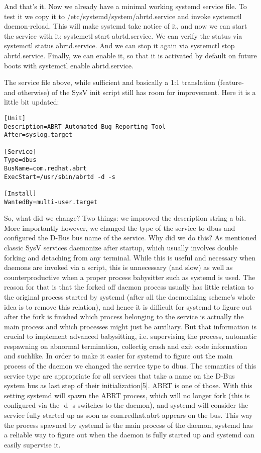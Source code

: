 \documentclass[titlepage]{article}
\begin{document}
And that's it. Now we already have a minimal working systemd service file. To test it we copy it to /etc/systemd/system/abrtd.service and invoke systemctl daemon-reload. This will make systemd take notice of it, and now we can start the service with it: systemctl start abrtd.service. We can verify the status via systemctl status abrtd.service. And we can stop it again via systemctl stop abrtd.service. Finally, we can enable it, so that it is activated by default on future boots with systemctl enable abrtd.service.

The service file above, while sufficient and basically a 1:1 translation (feature- and otherwise) of the SysV init script still has room for improvement. Here it is a little bit updated:
\begin{lstlisting}
[Unit]
Description=ABRT Automated Bug Reporting Tool
After=syslog.target

[Service]
Type=dbus
BusName=com.redhat.abrt
ExecStart=/usr/sbin/abrtd -d -s

[Install]
WantedBy=multi-user.target
\end{lstlisting}
So, what did we change? Two things: we improved the description string a bit. More importantly however, we changed the type of the service to dbus and configured the D-Bus bus name of the service. Why did we do this? As mentioned classic SysV services daemonize after startup, which usually involves double forking and detaching from any terminal. While this is useful and necessary when daemons are invoked via a script, this is unnecessary (and slow) as well as counterproductive when a proper process babysitter such as systemd is used. The reason for that is that the forked off daemon process usually has little relation to the original process started by systemd (after all the daemonizing scheme's whole idea is to remove this relation), and hence it is difficult for systemd to figure out after the fork is finished which process belonging to the service is actually the main process and which processes might just be auxiliary. But that information is crucial to implement advanced babysitting, i.e. supervising the process, automatic respawning on abnormal termination, collectig crash and exit code information and suchlike. In order to make it easier for systemd to figure out the main process of the daemon we changed the service type to dbus. The semantics of this service type are appropriate for all services that take a name on the D-Bus system bus as last step of their initialization[5]. ABRT is one of those. With this setting systemd will spawn the ABRT process, which will no longer fork (this is configured via the -d -s switches to the daemon), and systemd will consider the service fully started up as soon as com.redhat.abrt appears on the bus. This way the process spawned by systemd is the main process of the daemon, systemd has a reliable way to figure out when the daemon is fully started up and systemd can easily supervise it.
\end{document}
